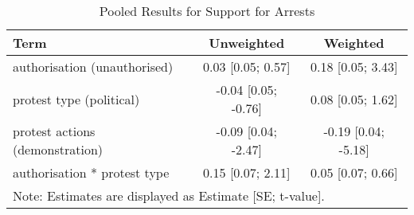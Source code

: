 \begin{table}[ht]
\centering
\begin{tabular}{lcc}
  \hline
Term & Unweighted & Weighted \\ 
  \hline
authorisation (unauthorised) & 0.03 [0.05; 0.57] & 0.18 [0.05; 3.43] \\ 
  protest type (political) & -0.04 [0.05; -0.76] & 0.08 [0.05; 1.62] \\ 
  protest actions (demonstration) & -0.09 [0.04; -2.47] & -0.19 [0.04; -5.18] \\ 
  authorisation * protest type & 0.15 [0.07; 2.11] & 0.05 [0.07; 0.66] \\ 
   \hline
\multicolumn{3}{l}{Note: Estimates are displayed as Estimate [SE; t-value].} \\
 \hline
\end{tabular}
\caption{Pooled Results for Support for Arrests} 
\end{table}
